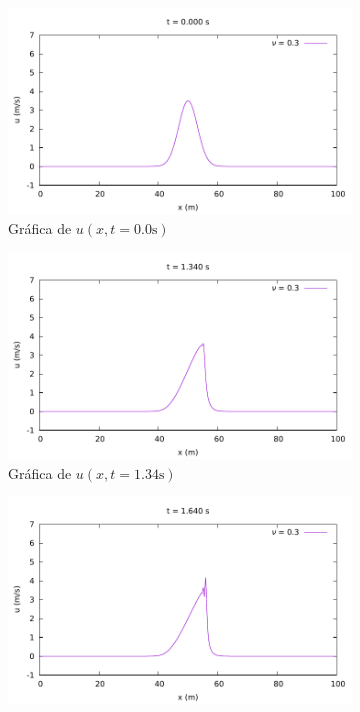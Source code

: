 \documentclass[12pt]{article}
\begin{document}
	\begin{figure}[ht]
		\centering
		\begin{subfigure}[b]{0.4\textwidth}
			\includegraphics[width=\textwidth]{../burg-vis1DDF/results/frames0.3/frame000.pdf}
			\caption*{Gráfica de $u(x,t=0.0\unit{\second})$}
			\label{fig:vis0.3-1}
		\end{subfigure}
		\hfill
		\begin{subfigure}[b]{0.4\textwidth}
			\includegraphics[width=\textwidth]{../burg-vis1DDF/results/frames0.3/frame067.pdf}
			\caption*{Gráfica de $u(x,t=1.34\unit{\second})$}
			\label{fig:vis0.3-2}
		\end{subfigure}
		\par\medskip
		\begin{subfigure}[b]{0.4\textwidth}
			\includegraphics[width=\textwidth]{../burg-vis1DDF/results/frames0.3/frame082.pdf}

\end{subfigure}
\end{figure}
\end{document}
